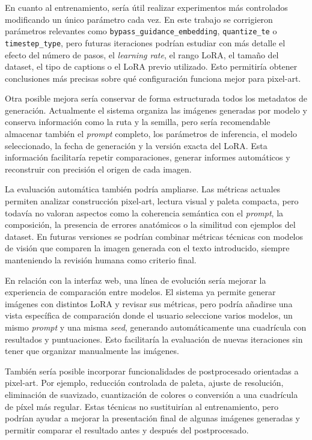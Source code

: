 \documentclass[a4paper,11pt,titlepage]{scrbook}
\begin{document}
\medskip

En cuanto al entrenamiento, sería útil realizar experimentos más controlados modificando un único parámetro cada vez. En este trabajo se corrigieron parámetros relevantes como \texttt{bypass_guidance_embedding}, \texttt{quantize_te} o \texttt{timestep_type}, pero futuras iteraciones podrían estudiar con más detalle el efecto del número de pasos, el \textit{learning rate}, el rango LoRA, el tamaño del dataset, el tipo de captions o el LoRA previo utilizado. Esto permitiría obtener conclusiones más precisas sobre qué configuración funciona mejor para pixel-art.

\medskip

Otra posible mejora sería conservar de forma estructurada todos los metadatos de generación. Actualmente el sistema organiza las imágenes generadas por modelo y conserva información como la ruta y la semilla, pero sería recomendable almacenar también el \textit{prompt} completo, los parámetros de inferencia, el modelo seleccionado, la fecha de generación y la versión exacta del LoRA. Esta información facilitaría repetir comparaciones, generar informes automáticos y reconstruir con precisión el origen de cada imagen.

\medskip

La evaluación automática también podría ampliarse. Las métricas actuales permiten analizar construcción pixel-art, lectura visual y paleta compacta, pero todavía no valoran aspectos como la coherencia semántica con el \textit{prompt}, la composición, la presencia de errores anatómicos o la similitud con ejemplos del dataset. En futuras versiones se podrían combinar métricas técnicas con modelos de visión que comparen la imagen generada con el texto introducido, siempre manteniendo la revisión humana como criterio final.

\medskip

En relación con la interfaz web, una línea de evolución sería mejorar la experiencia de comparación entre modelos. El sistema ya permite generar imágenes con distintos LoRA y revisar sus métricas, pero podría añadirse una vista específica de comparación donde el usuario seleccione varios modelos, un mismo \textit{prompt} y una misma \textit{seed}, generando automáticamente una cuadrícula con resultados y puntuaciones. Esto facilitaría la evaluación de nuevas iteraciones sin tener que organizar manualmente las imágenes.

\medskip

También sería posible incorporar funcionalidades de postprocesado orientadas a pixel-art. Por ejemplo, reducción controlada de paleta, ajuste de resolución, eliminación de suavizado, cuantización de colores o conversión a una cuadrícula de píxel más regular. Estas técnicas no sustituirían al entrenamiento, pero podrían ayudar a mejorar la presentación final de algunas imágenes generadas y permitir comparar el resultado antes y después del postprocesado.
\end{document}
